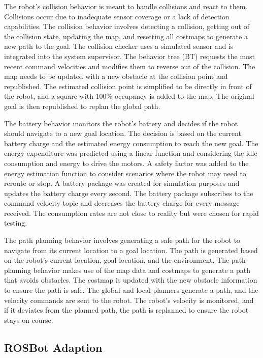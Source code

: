 \documentclass[letterpaper, 10pt, conference]{ieeeconf}
\begin{document}
The robot's collision behavior is meant to handle collisions and react to them. Collisions occur due to inadequate sensor coverage or a lack of detection capabilities. The collision behavior involves detecting a collision, getting out of the collision state, updating the map, and resetting all costmaps to generate a new path to the goal. The collision checker uses a simulated sensor and is integrated into the system supervisor. The behavior tree (BT) requests the most recent command velocities and modifies them to reverse out of the collision. The map needs to be updated with a new obstacle at the collision point and republished. The estimated collision point is simplified to be directly in front of the robot, and a square with 100\% occupancy is added to the map. The original goal is then republished to replan the global path.

The battery behavior monitors the robot's battery and decides if the robot should navigate to a new goal location. The decision is based on the current battery charge and the estimated energy consumption to reach the new goal. The energy expenditure was predicted using a linear function and considering the idle consumption and energy to drive the motors. A safety factor was added to the energy estimation function to consider scenarios where the robot may need to reroute or stop. A battery package was created for simulation purposes and updates the battery charge every second. The battery package subscribes to the command velocity topic and decreases the battery charge for every message received. The consumption rates are not close to reality but were chosen for rapid testing.

The path planning behavior involves generating a safe path for the robot to navigate from its current location to a goal location. The path is generated based on the robot's current location, goal location, and the environment. The path planning behavior makes use of the map data and costmaps to generate a path that avoids obstacles. The costmap is updated with the new obstacle information to ensure the path is safe. The global and local planners generate a path, and the velocity commands are sent to the robot. The robot's velocity is monitored, and if it deviates from the planned path, the path is replanned to ensure the robot stays on course.

\subsection{ROSBot Adaption}
   
\end{document}

